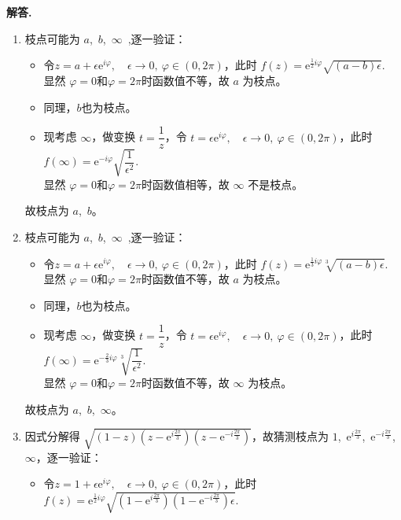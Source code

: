 \documentclass[11pt]{ctexart}
\newenvironment{solution}{\par\noindent\textbf{解答. }}{\par}
\begin{document}
\begin{solution}
    \begin{enumerate}[(1)]
        \item 枝点可能为 $a$,\ $b$,\ $\infty$\ ,逐一验证：
        \begin{itemize}
            \item 令$z = a + \epsilon\text{e}^{i\varphi},\quad \epsilon\to 0,\ \varphi\in(0,2\pi)$，此时 $f(z) = \text{e}^{\frac{1}{2}i\varphi}\sqrt{(a - b)\epsilon}$. \\
            显然 $\varphi = 0$和$\varphi = 2\pi$时函数值不等，故 $a$ 为枝点。
            \item 同理，$b$也为枝点。
            \item 现考虑 $\infty$，做变换 $t = \dfrac{1}{z}$，令 $t = \epsilon\text{e}^{i\varphi},\quad \epsilon\to 0,\ \varphi\in(0,2\pi)$，此时 $f(\infty) = \text{e}^{-i\varphi}\sqrt{\dfrac{1}{\epsilon^2}}$. \\
            显然 $\varphi = 0$和$\varphi = 2\pi$时函数值相等，故 $\infty$ 不是枝点。
        \end{itemize}
        故枝点为 $a$,\ $b$。
        \item 枝点可能为 $a$,\ $b$,\ $\infty$\ ,逐一验证：
        \begin{itemize}
            \item 令$z = a + \epsilon\text{e}^{i\varphi},\quad \epsilon\to 0,\ \varphi\in(0,2\pi)$，此时 $f(z) = \text{e}^{\frac{1}{3}i\varphi}\sqrt[3]{(a - b)\epsilon}$. \\
            显然 $\varphi = 0$和$\varphi = 2\pi$时函数值不等，故 $a$ 为枝点。
            \item 同理，$b$也为枝点。
            \item 现考虑 $\infty$，做变换 $t = \dfrac{1}{z}$，令 $t = \epsilon\text{e}^{i\varphi},\quad \epsilon\to 0,\ \varphi\in(0,2\pi)$，此时 $f(\infty) = \text{e}^{-\frac{2}{3}i\varphi}\sqrt[3]{\dfrac{1}{\epsilon^2}}$. \\
            显然 $\varphi = 0$和$\varphi = 2\pi$时函数值不等，故 $\infty$ 为枝点。
        \end{itemize}
        故枝点为 $a$,\ $b$,\ $\infty$。
        \item 因式分解得 $\sqrt{(1-z)(z-\text{e}^{i\frac{2\pi}{3}})(z-\text{e}^{-i\frac{2\pi}{3}})}$，故猜测枝点为 $1$,\ $\text{e}^{i\frac{2\pi}{3}}$,\ $\text{e}^{-i\frac{2\pi}{3}}$,\ $\infty$，逐一验证：
        \begin{itemize}
            \item 令$z = 1 + \epsilon\text{e}^{i\varphi},\quad \epsilon\to 0,\ \varphi\in(0,2\pi)$，此时 $f(z) = \text{e}^{\frac{1}{2}i\varphi}\sqrt{(1-\text{e}^{i\frac{2\pi}{3}})(1-\text{e}^{-i\frac{2\pi}{3}})\epsilon}$. \\

\end{itemize}
\end{enumerate}
\end{solution}
\end{document}
